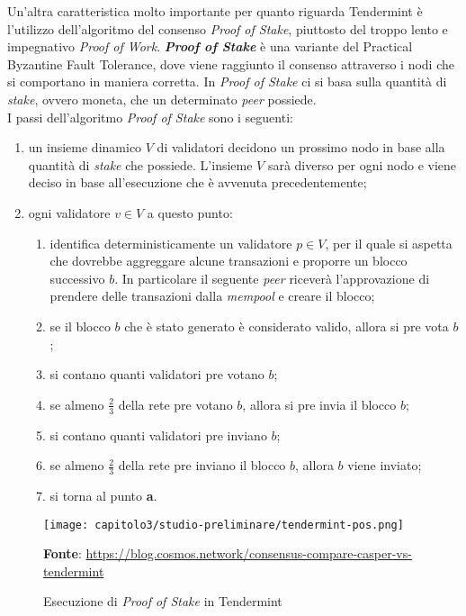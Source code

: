 Un'altra caratteristica molto importante per quanto riguarda Tendermint è l'utilizzo dell'algoritmo del consenso \textit{Proof of Stake}, piuttosto del troppo lento e impegnativo \textit{Proof of Work}.
\textbf{\textit{Proof of Stake}} è una variante del \gls{Practical Byzantine Fault Tolerance}, dove viene raggiunto il consenso attraverso i nodi che si comportano in maniera corretta. In \textit{Proof of Stake} ci si basa sulla quantità di \textit{stake}, ovvero moneta, che un determinato \textit{peer} possiede. \\

\noindent I passi dell'algoritmo \textit{Proof of Stake} sono i seguenti:
\begin{enumerate}[label=\lett]
  \item un insieme dinamico \( V \) di validatori decidono un prossimo nodo in base alla quantità di \textit{stake} che possiede. L'insieme \( V \) sarà diverso per ogni nodo e viene deciso in base all'esecuzione che è avvenuta precedentemente;
  \item ogni validatore \( v \in V \) a questo punto:
  \begin{enumerate}[label=\arabic*.]
    \item identifica deterministicamente un validatore \( p \in V \), per il quale si aspetta che dovrebbe aggreggare alcune transazioni e proporre un blocco successivo \( b \). In particolare il seguente \textit{peer} riceverà l'approvazione di prendere delle transazioni dalla \textit{mempool} e creare il blocco;
    \item se il blocco \( b \) che è stato generato è considerato valido, allora si pre vota \( b \);
    \item si contano quanti validatori pre votano \( b \);
    \item se almeno \( \frac{2}{3} \) della rete pre votano \( b \), allora si pre invia il blocco \( b \);
    \item si contano quanti validatori pre inviano \( b \);
    \item se almeno \( \frac{2}{3} \) della rete pre inviano il blocco \( b \), allora \( b \) viene inviato;
    \item si torna al punto \textbf{a}.
  \end{enumerate}
\end{enumerate}

\begin{figure}[h!]
  \centering
  \texttt{[image: capitolo3/studio-preliminare/tendermint-pos.png]}
  \caption{Esecuzione di \textit{Proof of Stake} in Tendermint}
  \textbf{Fonte}: \href{https://blog.cosmos.network/consensus-compare-casper-vs-tendermint-6df154ad56ae}{https://blog.cosmos.network/consensus-compare-casper-vs-tendermint}
\end{figure}

